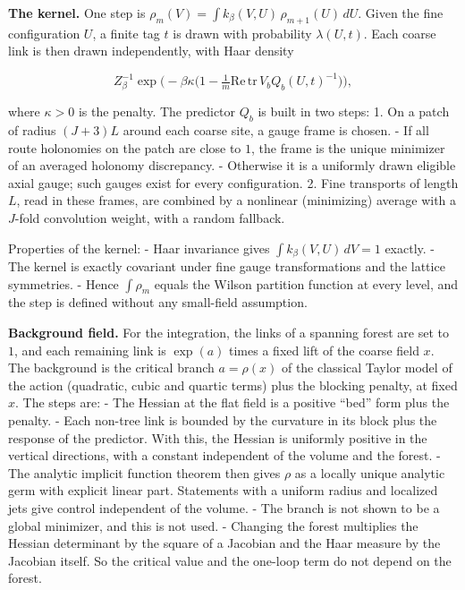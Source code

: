 \documentclass[
  letterpaper,
  11pt]{article}
\begin{document}
\textbf{The kernel.} One step is
\(\rho_m(V)=\int k_\beta(V,U)\,\rho_{m+1}(U)\,dU\). Given the fine
configuration \(U\), a finite tag \(t\) is drawn with probability
\(\lambda(U,t)\). Each coarse link is then drawn independently, with
Haar density

\[Z_\beta^{-1}\exp\Big(-\beta\kappa\big(1-\tfrac1m\mathrm{Re}\,\mathrm{tr}\,V_bQ_b(U,t)^{-1}\big)\Big),\]

where \(\kappa>0\) is the penalty. The predictor \(Q_b\) is built in two
steps: 1. On a patch of radius \((J+3)L\) around each coarse site, a
gauge frame is chosen. - If all route holonomies on the patch are close
to \(1\), the frame is the unique minimizer of an averaged holonomy
discrepancy. - Otherwise it is a uniformly drawn eligible axial gauge;
such gauges exist for every configuration. 2. Fine transports of length
\(L\), read in these frames, are combined by a nonlinear (minimizing)
average with a \(J\)-fold convolution weight, with a random fallback.

Properties of the kernel: - Haar invariance gives
\(\int k_\beta(V,U)\,dV=1\) exactly. - The kernel is exactly covariant
under fine gauge transformations and the lattice symmetries. - Hence
\(\int\rho_m\) equals the Wilson partition function at every level, and
the step is defined without any small-field assumption.

\textbf{Background field.} For the integration, the links of a spanning
forest are set to \(1\), and each remaining link is \(\exp(a)\) times a
fixed lift of the coarse field \(x\). The background is the critical
branch \(a=\rho(x)\) of the classical Taylor model of the action
(quadratic, cubic and quartic terms) plus the blocking penalty, at fixed
\(x\). The steps are: - The Hessian at the flat field is a positive
``bed'' form plus the penalty. - Each non-tree link is bounded by the
curvature in its block plus the response of the predictor. With this,
the Hessian is uniformly positive in the vertical directions, with a
constant independent of the volume and the forest. - The analytic
implicit function theorem then gives \(\rho\) as a locally unique
analytic germ with explicit linear part. Statements with a uniform
radius and localized jets give control independent of the volume. - The
branch is not shown to be a global minimizer, and this is not used. -
Changing the forest multiplies the Hessian determinant by the square of
a Jacobian and the Haar measure by the Jacobian itself. So the critical
value and the one-loop term do not depend on the forest.
\end{document}
